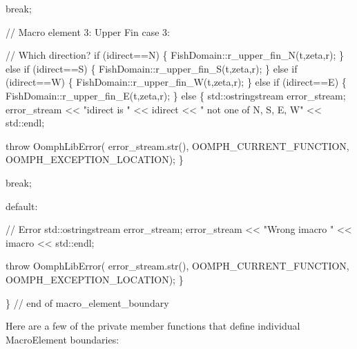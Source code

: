 \begin{DoxyCodeInclude}
   \textcolor{keywordflow}{break};


   \textcolor{comment}{// Macro element 3: Upper Fin}
  \textcolor{keywordflow}{case} 3:
   
   \textcolor{comment}{// Which direction?}
   \textcolor{keywordflow}{if} (idirect==N)
    \{
     FishDomain::r\_upper\_fin\_N(t,zeta,r);
    \}
   \textcolor{keywordflow}{else} \textcolor{keywordflow}{if} (idirect==S)
    \{
     FishDomain::r\_upper\_fin\_S(t,zeta,r);
    \}
   \textcolor{keywordflow}{else} \textcolor{keywordflow}{if} (idirect==W)
    \{
     FishDomain::r\_upper\_fin\_W(t,zeta,r);
    \}
   \textcolor{keywordflow}{else} \textcolor{keywordflow}{if} (idirect==E)
    \{
     FishDomain::r\_upper\_fin\_E(t,zeta,r);
    \}
   \textcolor{keywordflow}{else}
    \{
     std::ostringstream error\_stream;
     error\_stream << \textcolor{stringliteral}{"idirect is "} << idirect 
                  << \textcolor{stringliteral}{" not one of N, S, E, W"} <<  std::endl;

     \textcolor{keywordflow}{throw} OomphLibError(
      error\_stream.str(),
      OOMPH\_CURRENT\_FUNCTION,
      OOMPH\_EXCEPTION\_LOCATION);
    \}
   
   \textcolor{keywordflow}{break};   

  \textcolor{keywordflow}{default}:
   
   \textcolor{comment}{// Error}
   std::ostringstream error\_stream;
   error\_stream << \textcolor{stringliteral}{"Wrong imacro "} << imacro << std::endl;

   \textcolor{keywordflow}{throw} OomphLibError(
    error\_stream.str(),
    OOMPH\_CURRENT\_FUNCTION,
    OOMPH\_EXCEPTION\_LOCATION);
  \}
 
\} \textcolor{comment}{// end of macro\_element\_boundary}

\end{DoxyCodeInclude}


Here are a few of the private member functions that define individual {\ttfamily Macro\+Element} boundaries\+:


